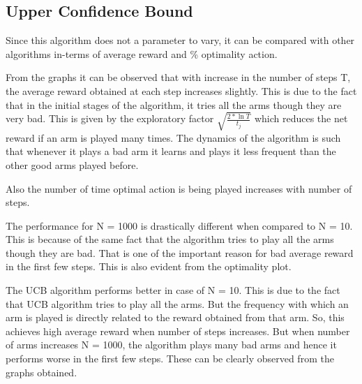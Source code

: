 \documentclass[a4paper,10pt]{report}
\begin{document}
\subsection{Upper Confidence Bound}
Since this algorithm does not a parameter to vary, it can be compared with other algorithms in-terms of average reward and \% optimality action.

From the graphs it can be observed that with increase in the number of steps T, the average reward obtained at each step increases slightly. This is due to the fact that in the initial stages of the algorithm, it tries all the arms though they are very bad. This is given by the exploratory factor $\sqrt{\frac{2*\ln T}{t_j}}$ which reduces the net reward if an arm is played many times. The dynamics of the algorithm is such that whenever it plays a bad arm it learns and plays it less frequent than the other good arms played before.

Also the number of time optimal action is being played increases with number of steps.

The performance for N = 1000 is drastically different when compared to N = 10. This is because of the same fact that the algorithm tries to play all the arms though they are bad. That is one of the important reason for bad average reward in the first few steps.
This is also evident from the optimality plot.

The UCB algorithm performs better in case of N = 10. This is due to the fact that UCB algorithm tries to play all the arms. But the frequency with which an arm is played is directly related to the reward obtained from that arm. So, this achieves high average reward when number of steps increases. But when number of arms increases N = 1000, the algorithm plays many bad arms and hence it performs worse in the first few steps. These can be clearly observed from the graphs obtained.
\end{document}
